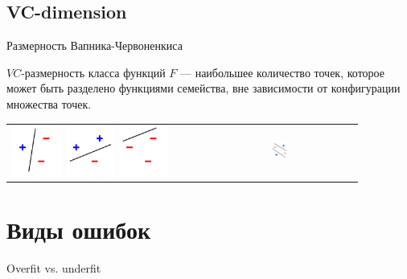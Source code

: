\documentclass[14pt, fleqn, xcolor={dvipsnames, table}]{beamer}
\begin{document}
\subsection{VC-dimension}
\begin{frame}{Размерность Вапника-Червоненкиса}
\begin{definition}
$VC$-размерность класса функций $F$ --- наибольшее количество точек, которое может быть разделено функциями семейства, вне зависимости от конфигурации множества точек.
\end{definition}
\begin{tabular}{p{}p{}}
\colorbox{green!10}{
\includegraphics[width=0.20\textwidth]{100px-VC1.png}\hspace{2px}
\includegraphics[width=0.20\textwidth]{100px-VC2.png}\hspace{2px}
\includegraphics[width=0.20\textwidth]{100px-VC3.png}\hspace{1px}
} & \colorbox{red!10}{
\includegraphics[width=0.20\textwidth]{100px-VC4.png}\hspace{1px}
} \\
\end{tabular}
\end{frame}

\section{Виды ошибок}
\begin{frame}{Overfit vs. underfit}

\end{frame}
\end{document}
